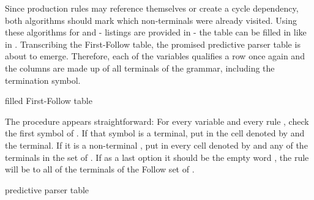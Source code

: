 Since production rules may reference themselves or create a cycle dependency, both algorithms should mark which non-terminals were already visited. Using these algorithms for  and  -  listings are provided in  - the table can be filled in like in . Transcribing the First-Follow table, the promised predictive \textlang{} parser table is about to emerge. Therefore, each of the variables qualifies a row once again and the columns are made up of all terminals of the grammar, including the termination symbol.

\begin{table}
	\centering
	\caption{filled First-Follow table}
	\label{tab:example_firstFollow_filled}
	
	
\end{table}

\FloatBarrier

The procedure appears straightforward: For every variable  and every rule , check the first symbol of . If that symbol is a terminal, put  in the cell denoted by  and the terminal. If it is a non-terminal , put  in every cell denoted by  and any of the terminals in the  set of . If as a last option it should be the empty word \straightepsilon{}, the rule will be to all of the terminals of the Follow set of .

\begin{table}
	\caption{predictive parser table}
	\label{tab:parseTab_example}

	
\end{table}

